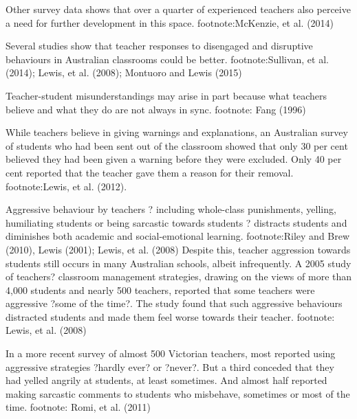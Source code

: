 Other survey data shows that over a quarter of experienced teachers also perceive a need for further development in this space.  footnote:McKenzie, et al. (2014)

%

%

Several studies show that teacher responses to disengaged and disruptive behaviours in Australian classrooms could be better. footnote:Sullivan, et al. (2014); Lewis, et al. (2008); Montuoro and Lewis (2015)

Teacher-student misunderstandings may arise in part because what teachers believe and what they do are not always in sync. footnote:  Fang (1996)

While teachers believe in giving warnings and explanations, an Australian survey of students who had been sent out of the classroom showed that only 30 per cent believed they had been given a warning before they were excluded. Only 40 per cent reported that the teacher gave them a reason for their removal. footnote:Lewis, et al. (2012). 


Aggressive behaviour by teachers ? including whole-class punishments, yelling, humiliating students or being sarcastic towards students ? distracts students and diminishes both academic and social-emotional learning. footnote:Riley and Brew (2010), Lewis (2001); Lewis, et al. (2008) 
Despite this, teacher aggression towards students still occurs in many Australian schools, albeit infrequently. A 2005 study of teachers? classroom management strategies, drawing on the views of more than 4,000 students and nearly 500 teachers, reported that some teachers were aggressive ?some of the time?. 
The study found that such aggressive behaviours distracted students and made them feel worse towards their teacher. footnote: Lewis, et al. (2008) 

In a more recent survey of almost 500 Victorian teachers, most reported using aggressive strategies ?hardly ever? or ?never?. But a third conceded that they had yelled angrily at students, at least sometimes. And almost half reported making sarcastic comments to students who misbehave, sometimes or most of the time. footnote: Romi, et al. (2011)

